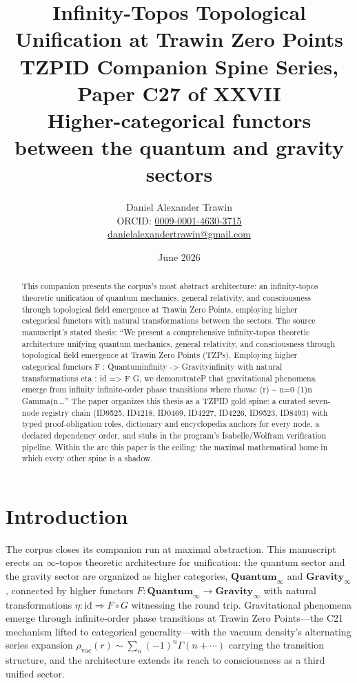 \documentclass[11pt]{article}
\title{Infinity-Topos Topological Unification at Trawin Zero Points\\[0.6em]
\large TZPID Companion Spine Series, Paper C27 of XXVII\\
\normalsize Higher-categorical functors between the quantum and gravity sectors}
\author{Daniel Alexander Trawin\\
\small ORCID: \href{https://orcid.org/0009-0001-4630-3715}{0009-0001-4630-3715}\\
\small \href{mailto:danielalexandertrawin@gmail.com}{danielalexandertrawin@gmail.com}}
\date{June 2026}
\theoremstyle{remark}
\begin{document}
\maketitle

\begin{abstract}
This companion presents the corpus's most abstract architecture: an infinity-topos theoretic unification of quantum mechanics, general relativity, and consciousness through topological field emergence at Trawin Zero Points, employing higher categorical functors with natural transformations between the sectors.
The source manuscript's stated thesis: ``We present a comprehensive infinity-topos theoretic architecture unifying quantum mechanics, general relativity, and consciousness through topological field emergence at Trawin Zero Points (TZPs). Employing higher categorical functors F : Quantuminfinity -> Gravityinfinity with natural transformations eta : id => F  G, we demonstrateP that gravitational phenomena emerge from infinity infinite-order phase transitions where rhovac (r) \textasciitilde{} n=0 (1)n Gamma(n\,\ldots'' The paper organizes this thesis as a TZPID gold spine: a curated seven-node registry chain (ID9525, ID4218, ID0469, ID4227, ID4226, ID9523, ID8493) with typed proof-obligation roles, dictionary and encyclopedia anchors for every node, a declared dependency order, and stubs in the program's Isabelle/Wolfram verification pipeline. Within the arc this paper is the ceiling: the maximal mathematical home in which every other spine is a shadow.
\end{abstract}

\section{Introduction}
\label{sec:intro}

The corpus closes its companion run at maximal abstraction. This manuscript erects an $\infty$-topos theoretic architecture for unification: the quantum sector and the gravity sector are organized as higher categories, $\mathbf{Quantum}_\infty$ and $\mathbf{Gravity}_\infty$, connected by higher functors $F: \mathbf{Quantum}_\infty \to \mathbf{Gravity}_\infty$ with natural transformations $\eta: \mathrm{id} \Rightarrow F \circ G$ witnessing the round trip. Gravitational phenomena emerge through infinite-order phase transitions at Trawin Zero Points---the C21 mechanism lifted to categorical generality---with the vacuum density's alternating series expansion $\rho_{\mathrm{vac}}(r) \sim \sum_n (-1)^n \Gamma(n + \cdots)$ carrying the transition structure, and the architecture extends its reach to consciousness as a third unified sector.
\end{document}
